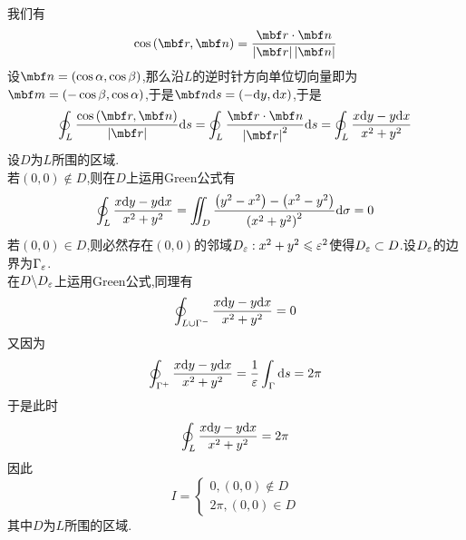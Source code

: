 \documentclass{ctexart}
\begin{document}
\begin{solution}
    我们有
    \[\cos\left(\mbf r,\mbf n\right)=\dfrac{\mbf r\cdot\mbf n}{\left|\mbf r\right|\left|\mbf n\right|}\]
    设$\mbf n=(\cos\alpha,\cos\beta)$,那么沿$L$的逆时针方向单位切向量即为$\mbf m=(-\cos\beta,\cos\alpha)$,于是$\mbf n\di s=\left(-\di y,\dx\right)$,于是
    \[\oint_{L}\dfrac{\cos\left(\mbf r,\mbf n\right)}{\left|\mbf r\right|}\di s
    =\oint_{L}\dfrac{\mbf r\cdot\mbf n}{\left|\mbf r\right|^2}\di s
    =\oint_{L}\dfrac{x\di y-y\di x}{x^2+y^2}\]
    设$D$为$L$所围的区域.\\
    若$(0,0)\notin D$,则在$D$上运用Green公式有
    \[\oint_{L}\dfrac{x\mathrm{d} y-y\mathrm{d} x}{x^2+y^2}=\iint_D\dfrac{\left(y^2-x^2\right)-\left(x^2-y^2\right)}{\left(x^2+y^2\right)^2}\mathrm{d}\sigma=0\]
    若$(0,0)\in D$,则必然存在$(0,0)$的邻域$D_\varepsilon:x^2+y^2\leqslant\varepsilon^2$使得$D_\varepsilon\subset D$.设$D_\varepsilon$的边界为$\Gamma_\varepsilon$.\\
    在$D\backslash D_\varepsilon$上运用Green公式,同理有
    \[\oint_{L\cup\Gamma^-}\dfrac{x\mathrm{d} y-y\mathrm{d} x}{x^2+y^2}=0\]
    又因为
    \[\oint_{\Gamma^+}\dfrac{x\mathrm{d} y-y\mathrm{d} x}{x^2+y^2}=\dfrac{1}{\varepsilon}\int_{\Gamma}\mathrm{d} s=2\pi\]
    于是此时
    \[\oint_{L}\dfrac{x\mathrm{d} y-y\mathrm{d} x}{x^2+y^2}=2\pi\]
    因此
    \[I=\left\{\begin{array}{l}
        0,(0,0)\notin D \\
        2\pi,(0,0)\in D
    \end{array}\right.\]
    其中$D$为$L$所围的区域.
\end{solution}
\end{document}

